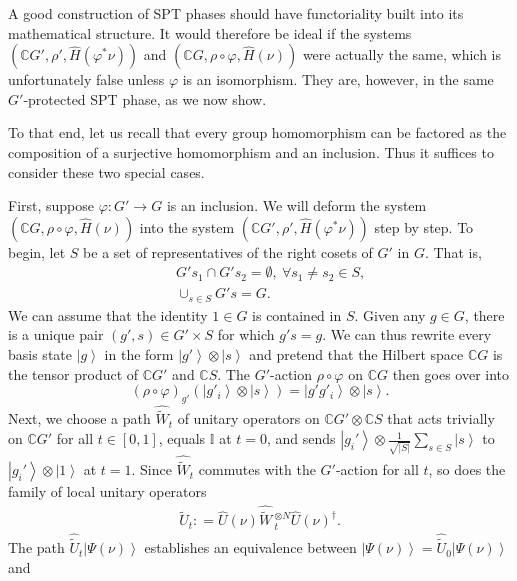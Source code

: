 \documentclass[sort&compress]{elsarticle}
\theoremstyle{theoremstyle}
\theoremstyle{framedtheoremstyle}
\theoremstyle{definitionstyle}
\theoremstyle{definitionstyle}
\theoremstyle{definitionstyle}
\theoremstyle{definitionstyle}
\theoremstyle{nameddefinitionstyle}
\theoremstyle{framednameddefinitionstyle}
\theoremstyle{proofstyle}
\theoremstyle{definitionstyle}
\newcommand{\fromto}{\rightarrow}
\newcommand{\CCC}{\mathbb{C}}
\newcommand{\coloneq}{\mathrel{\mathop:}=}
\newcommand{\bars}[1]{\left| #1 \right|}
\newcommand{\paren}[1]{\left( #1 \right)}
\newcommand{\ket}[1]{\left|#1\right\rangle}
\begin{document}
\begin{appendices}
A good construction of SPT phases should have functoriality built into its mathematical structure. It would therefore be ideal if the systems $\paren{\CCC G', \rho', \hat H(\varphi^* \nu)}$ and $\paren{\CCC G, \rho\circ\varphi, \hat H(\nu)}$ were actually the same, which is unfortunately false unless $\varphi$ is an isomorphism. They are, however, in the same $G'$-protected SPT phase, as we now show.

To that end, let us recall that every group homomorphism can be factored as the composition of a surjective homomorphism and an inclusion. Thus it suffices to consider these two special cases.

First, suppose $\varphi: G' \fromto G$ is an inclusion. We will deform the system $\paren{\CCC G, \rho\circ\varphi, \hat H(\nu)}$ into the system $\paren{\CCC G', \rho', \hat H(\varphi^* \nu)}$ step by step. To begin, let $S$ be a set of representatives of the right cosets of $G'$ in $G$. That is,
\begin{eqnarray}
&&G' s_1 \cap G' s_2 = \emptyset,~\forall s_1 \neq s_2\in S,\\
&& \cup_{s\in S} G' s = G.
\end{eqnarray}
We can assume that the identity $1\in G$ is contained in $S$. Given any $g\in G$, there is a unique pair $(g',s)\in G' \times S$ for which $g's = g$. We can thus rewrite every basis state $\ket g$ in the form $\ket{g'} \otimes \ket{s}$ and pretend that the Hilbert space $\CCC G$ is the tensor product of $\CCC G'$ and $\CCC S$. The $G'$-action $\rho \circ \varphi$ on $\CCC G$ then goes over into
\begin{equation}
\paren{\rho\circ \varphi}_{g'} \paren{\ket{g'_i} \otimes \ket{s} } = \ket{g' g'_i} \otimes \ket{s}.
\end{equation}
Next, we choose a path $\hat{\widetilde W}_t$ of unitary operators on $\CCC G' \otimes \CCC S$ that acts trivially on $\CCC G'$ for all $t\in [0,1]$, equals $\mathbb I$ at $t=0$, and sends $\ket{g_i'} \otimes \frac{1}{\sqrt{\bars S}} \sum_{s\in S} \ket{s} $ to $\ket{g_i'} \otimes \ket{1}$ at $t=1$. Since $\hat{\widetilde W}_t$ commutes with the $G'$-action for all $t$, so does the family of local unitary operators
\begin{eqnarray}
\hat{\widetilde U}_t \coloneq \hat U(\nu) \hat{\widetilde W}\,_t^{\otimes N} \hat U(\nu)^\dag.
\end{eqnarray}
The path $\hat{\widetilde U}_t \ket{\Psi(\nu)}$ establishes an equivalence between $\ket{\Psi(\nu)} = \hat{\widetilde U}_0 \ket{\Psi(\nu)}$ and
\begin{eqnarray}

\end{eqnarray}
\end{appendices}
\end{document}
